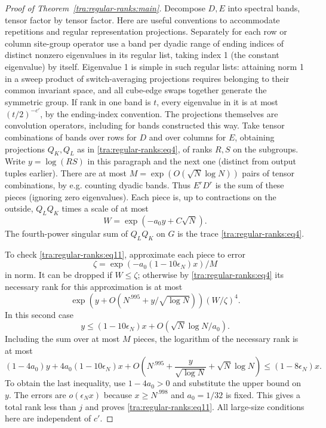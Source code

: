 \begin{proof}[Proof of Theorem~\ref{tra:regular-ranks:main}]
Decompose \(D,E\) into spectral bands, tensor factor by tensor factor. Here are useful conventions to accommodate repetitions and regular representation projections. Separately for each row or column site-group operator use a band per dyadic range of ending indices of distinct nonzero eigenvalues in its regular list, taking index 1 (the constant eigenvalue) by itself. Eigenvalue 1 is simple in such regular lists: attaining norm 1 in a sweep product of switch-averaging projections requires belonging to their common invariant space, and all cube-edge swaps together generate the symmetric group. If rank in one band is \(t\), every eigenvalue in it is at most \((t/2)^{-c'}\), by the ending-index convention. The projections themselves are convolution operators, including for bands constructed this way. Take tensor combinations of bands over rows for \(D\) and over columns for \(E\), obtaining projections \(Q_K,Q_L\) as in \eqref{tra:regular-ranks:eq4}, of ranks \(R,S\) on the subgroups. Write \(y=\log(RS)\) in this paragraph and the next one (distinct from output tuples earlier). There are at most \(M=\exp(O(\sqrt N\log N))\) pairs of tensor combinations, by e.g. counting dyadic bands. Thus \(E^r D^r\) is the sum of these pieces (ignoring zero eigenvalues). Each piece is, up to contractions on the outside, \(Q_L Q_K\) times a scale of at most
\[
                                W=\exp(-a_0 y+C\sqrt N).
\]
The fourth-power singular sum of \(Q_L Q_K\) on \(G\) is the trace \eqref{tra:regular-ranks:eq4}.

To check \eqref{tra:regular-ranks:eq11}, approximate each piece to error
\[
                             \zeta=\exp(-a_0(1-10\epsilon_N)x)/M
\]
in norm. It can be dropped if \(W\le\zeta\); otherwise by \eqref{tra:regular-ranks:eq4} its necessary rank for this approximation is at most
\[
                       \exp(y+O(N^{.995}+y/\sqrt{\log N}))
                                         (W/\zeta)^4 .
\]
In this second case
\[
                       y\le (1-10\epsilon_N)x
                                      +O(\sqrt N\log N/a_0).
\]
Including the sum over at most $M$ pieces, the logarithm of the
necessary rank is at most
\[
 (1-4a_0)y+4a_0(1-10\epsilon_N)x
 +O\!\left(N^{.995}+\frac{y}{\sqrt{\log N}}+\sqrt N\log N\right)
 \le (1-8\epsilon_N)x.
\]
To obtain the last inequality, use $1-4a_0>0$ and substitute the
upper bound on $y$. The errors are $o(\epsilon_N x)$ because
$x\ge N^{.998}$ and $a_0=1/32$ is fixed. This gives a total rank less than \(j\) and proves \eqref{tra:regular-ranks:eq11}. All large-size conditions here are independent of \(c'\).


\end{proof}
